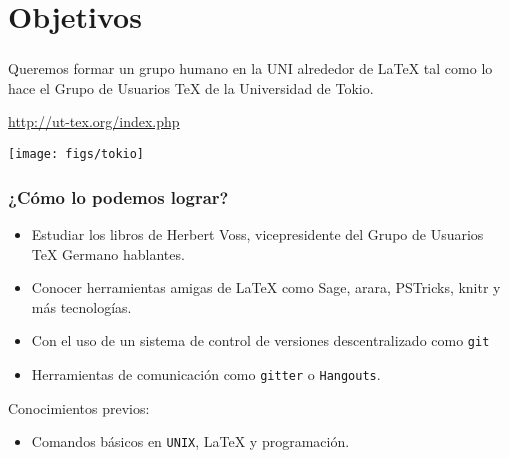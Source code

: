 \section{Objetivos}

\begin{frame}
\frametitle{\insertsection}
 	Queremos formar un grupo humano en la UNI alrededor de \LaTeX{} tal como lo hace el Grupo de Usuarios \TeX{} de la Universidad de Tokio.
 	
 	\url{http://ut-tex.org/index.php}
 	\begin{center}
 	\texttt{[image: figs/tokio]}		
 	\end{center}
\end{frame}

\begin{frame}[fragile]
\frametitle{¿Cómo lo podemos lograr?}
\begin{itemize}
	\item Estudiar los libros de Herbert Voss, vicepresidente del Grupo de Usuarios \TeX{} Germano hablantes.
	\item Conocer herramientas amigas de \LaTeX{} como Sage, arara, PSTricks, knitr y más tecnologías. 
	\item Con el uso de un sistema de control de versiones descentralizado como \texttt{git}
	\item Herramientas de comunicación como \texttt{gitter} o \texttt{Hangouts}.
\end{itemize}
Conocimientos previos:
\begin{itemize}
	\item Comandos básicos en \texttt{UNIX}, \LaTeX{} y programación.
\end{itemize}
\end{frame}



